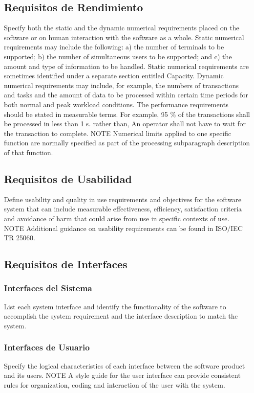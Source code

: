 \documentclass[12pt, a4paper, twoside]{article}
\begin{document}
\subsection{Requisitos de Rendimiento}
Specify both the static and the dynamic numerical requirements placed on the software or on human
interaction with the software as a whole.
Static numerical requirements may include the following:
a) the number of terminals to be supported;
b) the number of simultaneous users to be supported; and
c) the amount and type of information to be handled.
Static numerical requirements are sometimes identified under a separate section entitled Capacity.
Dynamic numerical requirements may include, for example, the numbers of transactions and tasks and
the amount of data to be processed within certain time periods for both normal and peak workload
conditions.
The performance requirements should be stated in measurable terms.
For example,
95 \% of the transactions shall be processed in less than 1 s.
rather than,
An operator shall not have to wait for the transaction to complete.
NOTE Numerical limits applied to one specific function are normally specified as part of the processing
subparagraph description of that function.

\subsection{Requisitos de Usabilidad}
Define usability and quality in use requirements and objectives for the software system that can include
measurable effectiveness, efficiency, satisfaction criteria and avoidance of harm that could arise from
use in specific contexts of use.
NOTE Additional guidance on usability requirements can be found in ISO/IEC TR 25060.

\subsection{Requisitos de Interfaces}

 \subsubsection{Interfaces del Sistema}
 List each system interface and identify the functionality of the software to accomplish the system
 requirement and the interface description to match the system.

 \subsubsection{Interfaces de Usuario}
 Specify the logical characteristics of each interface between the software product and its users.
 NOTE A style guide for the user interface can provide consistent rules for organization, coding and
 interaction of the user with the system.
\end{document}
